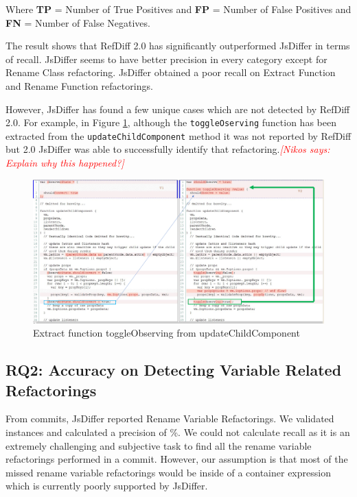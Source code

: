 \documentclass[letterpaper,12pt,onecolumn,final]{report}
\newcommand{\nikos}[1]{\textcolor{red}{{\it [Nikos says: #1]}}}
\begin{document}
Where  \textbf{TP} = Number of True Positives and \textbf{FP} = Number of False Positives and \textbf{FN} = Number of False Negatives.

The result shows that RefDiff 2.0 has significantly outperformed JsDiffer in terms of recall. JsDiffer seems to have better precision in every category except for Rename Class refactoring. JsDiffer obtained a poor recall on Extract Function and Rename Function refactorings.


However, JsDiffer has found a few unique cases which are not detected by RefDiff 2.0. For example, in Figure \ref{fig:extractToggle}, although the \texttt{toggleOserving} function has been extracted from the \texttt{updateChildComponent} method it was not reported by RefDiff but 2.0 JsDiffer was able to successfully identify that refactoring.\nikos{Explain why this happened?}

\begin{figure}
\includegraphics[width=\textwidth,height=\textheight,keepaspectratio]{extracttoggleObserving}
  \caption{Extract function toggleObserving from updateChildComponent}
   \label{fig:extractToggle}
\end{figure}



\subsection{RQ2: Accuracy on Detecting Variable Related Refactorings}

From \evTotalCommits{} commits, JsDiffer reported \renameVarTotalCount{} Rename Variable Refactorings. We validated \renameVarValidatedCount{} instances and calculated a precision of \renameVarPrecision{}\%.
We could not calculate recall as it is an extremely challenging and subjective task to find all the rename variable refactorings performed in a commit. However, our assumption is that most of the missed rename variable refactorings would be inside of a container expression which is currently poorly supported by JsDiffer.
\end{document}
